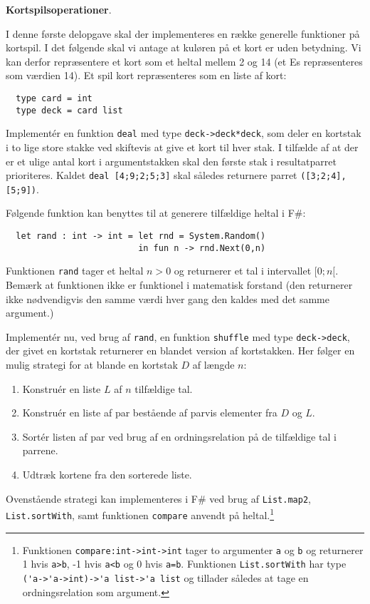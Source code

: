 \textbf{Kortspilsoperationer}.

I denne første delopgave skal der implementeres en række generelle
funktioner på kortspil. I det følgende skal vi antage at kuløren på et
kort er uden betydning. Vi kan derfor repræsentere et kort som et
heltal mellem 2 og 14 (et Es repræsenteres som værdien 14). Et spil
kort repræsenteres som en liste af kort:
\begin{lstlisting}
  type card = int
  type deck = card list
\end{lstlisting}

Implementér en funktion \lstinline{deal} med
type \lstinline{deck->deck*deck}, som deler en kortstak i to lige
store stakke ved skiftevis at give et kort til hver stak. I tilfælde
af at der er et ulige antal kort i argumentstakken skal den første
stak i resultatparret prioriteres. Kaldet \lstinline{deal [4;9;2;5;3]}
skal således returnere parret \lstinline{([3;2;4],[5;9])}.

Følgende funktion kan benyttes til at generere tilfældige heltal i F\#:
\begin{lstlisting}
  let rand : int -> int = let rnd = System.Random()
                          in fun n -> rnd.Next(0,n)
\end{lstlisting}
Funktionen \lstinline{rand} tager et heltal $n > 0$ og returnerer et tal
i intervallet $[0;n[$. Bemærk at funktionen ikke er funktionel i
matematisk forstand (den returnerer ikke nødvendigvis den samme værdi
hver gang den kaldes med det samme argument.)

Implementér nu, ved brug af \lstinline{rand}, en
funktion \lstinline{shuffle} med type \lstinline{deck->deck}, der
givet en kortstak returnerer en blandet version af
kortstakken. Her følger en mulig strategi for at blande en kortstak
$D$ af længde $n$:
\begin{enumerate}
\item Konstruér en liste $L$ af $n$ tilfældige tal.
\item Konstruér en liste af par bestående af parvis elementer fra $D$ og $L$.
\item Sortér listen af par ved brug af en ordningsrelation på de tilfældige tal i parrene.
\item Udtræk kortene fra den sorterede liste.
\end{enumerate}
Ovenstående strategi kan implementeres i F\# ved brug
af \lstinline{List.map2}, \lstinline{List.sortWith}, samt
funktionen \lstinline{compare} anvendt på
heltal.\footnote{Funktionen \lstinline{compare:int->int->int} tager to
argumenter \lstinline{a} og \lstinline{b} og returnerer 1
hvis \lstinline{a>b}, -1 hvis \lstinline{a<b} og 0
hvis \lstinline{a=b}. Funktionen \lstinline{List.sortWith} har
type \lstinline{('a->'a->int)->'a list->'a list} og tillader således
at tage en ordningsrelation som argument.}

